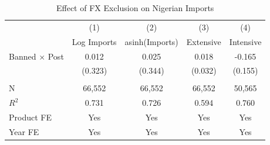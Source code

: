 \begin{table}[htbp]
\centering
\caption{Effect of FX Exclusion on Nigerian Imports}
\label{tab:main_did}
\begin{tabular}{lcccc}
\toprule
 & (1) & (2) & (3) & (4) \\
 & Log Imports & asinh(Imports) & Extensive & Intensive \\
\midrule
Banned $\times$ Post & 0.012 & 0.025 & 0.018 & -0.165 \\
 & (0.323) & (0.344) & (0.032) & (0.155) \\
 & & & & \\
N & 66,552 & 66,552 & 66,552 & 50,565 \\
$R^2$ & 0.731 & 0.726 & 0.594 & 0.760 \\
Product FE & Yes & Yes & Yes & Yes \\
Year FE & Yes & Yes & Yes & Yes \\
\bottomrule
\end{tabular}
\par{}
\end{table}
